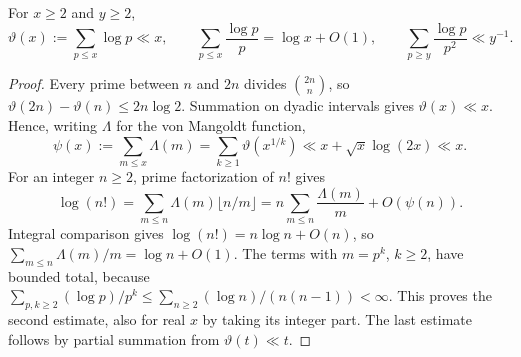 \begin{lemma}\label{sz-mertens}
For $x\ge2$ and $y\ge2$,
\[
 \vartheta(x):=\sum_{p\le x}\log p\ll x,
 \qquad \sum_{p\le x}\frac{\log p}{p}=\log x+O(1),
 \qquad \sum_{p\ge y}\frac{\log p}{p^2}\ll y^{-1}.
\]
\end{lemma}
\begin{proof}
Every prime between $n$ and $2n$ divides $\binom{2n}{n}$, so
$\vartheta(2n)-\vartheta(n)\le2n\log2$. Summation on dyadic intervals
gives $\vartheta(x)\ll x$. Hence, writing $\Lambda$ for the von Mangoldt
function,
\[
 \psi(x):=\sum_{m\le x}\Lambda(m)
 =\sum_{k\ge1}\vartheta(x^{1/k})
 \ll x+\sqrt x\log(2x)\ll x.
\]
For an integer $n\ge2$, prime factorization of $n!$ gives
\[
 \log(n!)=\sum_{m\le n}\Lambda(m)\lfloor n/m\rfloor
 =n\sum_{m\le n}\frac{\Lambda(m)}m+O(\psi(n)).
\]
Integral comparison gives $\log(n!)=n\log n+O(n)$, so
$\sum_{m\le n}\Lambda(m)/m=\log n+O(1)$. The terms with $m=p^k$,
$k\ge2$, have bounded total, because
$\sum_{p,k\ge2}(\log p)/p^k\le\sum_{n\ge2}(\log n)/(n(n-1))<\infty$.
This proves the second estimate, also for real $x$ by taking its integer
part. The last estimate follows by partial summation from
$\vartheta(t)\ll t$.
\end{proof}

